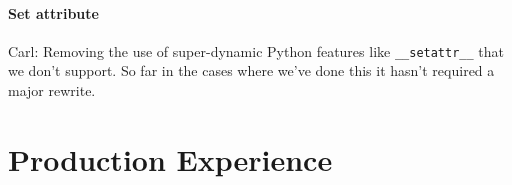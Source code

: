 \documentclass[english,cleveref,submission]{programming}
\newcommand{\code}[1]{\texttt{#1}}
\begin{document}
\paragraph{Set attribute}

Carl: Removing the use of super-dynamic Python features like
\code{\_\_setattr\_\_} that we don’t support. So far in the cases where
we’ve done this it hasn’t required a major rewrite.


\section{Production Experience}
\label{s:eval}




\end{document}
